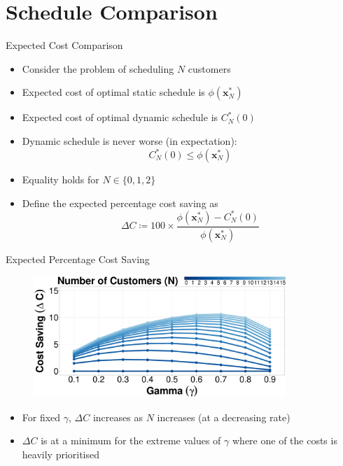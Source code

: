 \documentclass{beamer}
\begin{document}
\section{Schedule Comparison}

\begin{frame}{Expected Cost Comparison}
	\begin{itemize}
		\item Consider the problem of scheduling $N$ customers
		\item Expected cost of optimal static schedule is $\phi (\mathbf{x}_{N}^{*})$
		\item Expected cost of optimal dynamic schedule is $C_{N}^{*} (0)$
		\item Dynamic schedule is never worse (in expectation):
		\begin{equation*}
			C_{N}^{*} (0) \leq \phi (\mathbf{x}_{N}^{*})
		\end{equation*}
		\item Equality holds for $N \in \{ 0, 1, 2 \}$
		\item Define the \alert{expected percentage cost saving} as
		\begin{equation*}
			\Delta C \coloneqq 100 \times \frac{\phi (\mathbf{x}_{N}^{*}) - C_{N}^{*} (0)}{\phi (\mathbf{x}_{N}^{*})}
		\end{equation*}
	\end{itemize}
\end{frame}

\begin{frame}{Expected Percentage Cost Saving}
	\begin{figure}
		\centering
		\includegraphics[width=0.85\textwidth]{Cost_Saving_Line_Num.eps}
	\end{figure}

	\begin{itemize}
		\item For fixed $\gamma$, $\Delta C$ increases as $N$ increases (at a decreasing rate)
		\item $\Delta C$ is at a minimum for the extreme values of $\gamma$ where one of the costs is heavily prioritised
	\end{itemize}
\end{frame}
\end{document}
